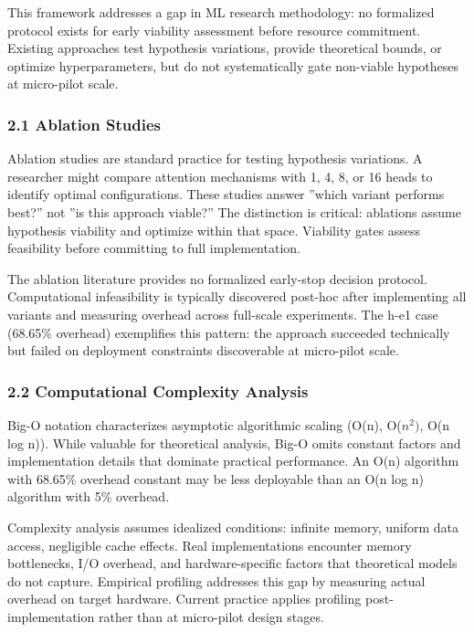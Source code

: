 
This framework addresses a gap in ML research methodology: no formalized protocol exists for early viability assessment before resource commitment. Existing approaches test hypothesis variations, provide theoretical bounds, or optimize hyperparameters, but do not systematically gate non-viable hypotheses at micro-pilot scale.

\subsubsection{2.1 Ablation Studies}

Ablation studies are standard practice for testing hypothesis variations. A researcher might compare attention mechanisms with 1, 4, 8, or 16 heads to identify optimal configurations. These studies answer ''which variant performs best?'' not ''is this approach viable?'' The distinction is critical: ablations assume hypothesis viability and optimize within that space. Viability gates assess feasibility before committing to full implementation.

The ablation literature provides no formalized early-stop decision protocol. Computational infeasibility is typically discovered post-hoc after implementing all variants and measuring overhead across full-scale experiments. The h-e1 case (68.65\% overhead) exemplifies this pattern: the approach succeeded technically but failed on deployment constraints discoverable at micro-pilot scale.

\subsubsection{2.2 Computational Complexity Analysis}

Big-O notation characterizes asymptotic algorithmic scaling (O(n), O($n^{2})$, O(n log n)). While valuable for theoretical analysis, Big-O omits constant factors and implementation details that dominate practical performance. An O(n) algorithm with 68.65\% overhead constant may be less deployable than an O(n log n) algorithm with 5\% overhead.

Complexity analysis assumes idealized conditions: infinite memory, uniform data access, negligible cache effects. Real implementations encounter memory bottlenecks, I/O overhead, and hardware-specific factors that theoretical models do not capture. Empirical profiling addresses this gap by measuring actual overhead on target hardware. Current practice applies profiling post-implementation rather than at micro-pilot design stages.

